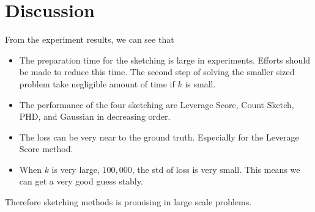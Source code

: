 \section{Discussion}

From the experiment results,
we can see that
\begin{itemize}
    \item The preparation time for the sketching is large in
    experiments. Efforts should be made to reduce this time.
    The second step of solving the smaller sized problem
    take negligible amount of time if $k$ is small.
    \item The performance of the four sketching are
    Leverage Score, Count Sketch, PHD, and Gaussian
    in decreasing order.
    \item The loss can be very near to the ground truth.
    Especially for the Leverage Score method.
    \item When $k$ is very large, \eg $100,000$,
    the std of loss is very small.
    This means we can get a very good guess stably.
\end{itemize}
Therefore sketching methods is promising in large scale problems.

